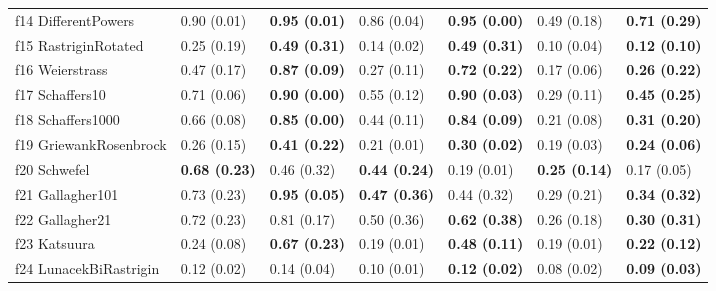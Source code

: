 \begin{table}
\begin{tabular}{lllllll}
f14 DifferentPowers & 0.90 (0.01) & \textbf{0.95 (0.01)} & 0.86 (0.04) & \textbf{0.95 (0.00)} & 0.49 (0.18) & \textbf{0.71 (0.29)} \\
f15 RastriginRotated & 0.25 (0.19) & \textbf{0.49 (0.31)} & 0.14 (0.02) & \textbf{0.49 (0.31)} & 0.10 (0.04) & \textbf{0.12 (0.10)} \\
f16 Weierstrass & 0.47 (0.17) & \textbf{0.87 (0.09)} & 0.27 (0.11) & \textbf{0.72 (0.22)} & 0.17 (0.06) & \textbf{0.26 (0.22)} \\
f17 Schaffers10 & 0.71 (0.06) & \textbf{0.90 (0.00)} & 0.55 (0.12) & \textbf{0.90 (0.03)} & 0.29 (0.11) & \textbf{0.45 (0.25)} \\
f18 Schaffers1000 & 0.66 (0.08) & \textbf{0.85 (0.00)} & 0.44 (0.11) & \textbf{0.84 (0.09)} & 0.21 (0.08) & \textbf{0.31 (0.20)} \\
f19 GriewankRosenbrock & 0.26 (0.15) & \textbf{0.41 (0.22)} & 0.21 (0.01) & \textbf{0.30 (0.02)} & 0.19 (0.03) & \textbf{0.24 (0.06)} \\
f20 Schwefel & \textbf{0.68 (0.23)} & 0.46 (0.32) & \textbf{0.44 (0.24)} & 0.19 (0.01) & \textbf{0.25 (0.14)} & 0.17 (0.05) \\
f21 Gallagher101 & 0.73 (0.23) & \textbf{0.95 (0.05)} & \textbf{0.47 (0.36)} & 0.44 (0.32) & 0.29 (0.21) & \textbf{0.34 (0.32)} \\
f22 Gallagher21 & 0.72 (0.23) & 0.81 (0.17) & 0.50 (0.36) & \textbf{0.62 (0.38)} & 0.26 (0.18) & \textbf{0.30 (0.31)} \\
f23 Katsuura & 0.24 (0.08) & \textbf{0.67 (0.23)} & 0.19 (0.01) & \textbf{0.48 (0.11)} & 0.19 (0.01) & \textbf{0.22 (0.12)} \\
f24 LunacekBiRastrigin & 0.12 (0.02) & 0.14 (0.04) & 0.10 (0.01) & \textbf{0.12 (0.02)} & 0.08 (0.02) & \textbf{0.09 (0.03)} \\
\bottomrule
\end{tabular}
\end{table}

